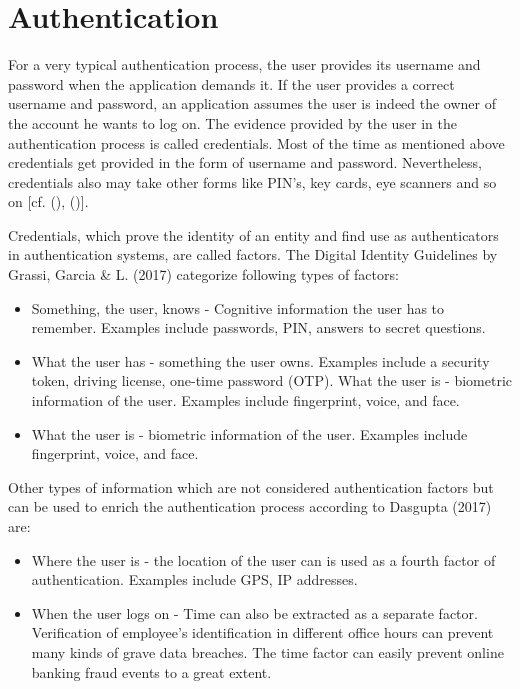 \section{Authentication}
\label{authentication}
For a very typical authentication process, the user provides its username and password when the application demands it. If the user provides a correct username and password, an application assumes the user is indeed the owner of the account he wants to log on. The evidence provided by the user in the authentication process is called credentials. Most of the time as mentioned above credentials get provided in the form of username and password. Nevertheless, credentials also may take other forms like PIN’s, key cards, eye scanners and so on [cf. (\cite{Todorov:2007:MUI}), (\cite{Boyd:2012:GSOAuth})]. 

Credentials, which prove the identity of an entity and find use as authenticators in authentication systems, are called factors. The Digital Identity Guidelines by Grassi, Garcia \& L. (2017) categorize following types of factors:

\begin{itemize}  
	\item Something, the user, knows - Cognitive information the user has to remember. Examples include passwords, PIN, answers to secret questions.
	\item What the user has - something the user owns. Examples include a security token, driving license, one-time password (OTP). 
	What the user is - biometric information of the user. Examples include fingerprint, voice, and face.  
	\item What the user is - biometric information of the user. Examples include fingerprint, voice, and face. 
\end{itemize}

Other types of information which are not considered authentication factors but  can be used to enrich the authentication process according to Dasgupta (2017) are:

\begin{itemize}
	\item Where the user is - the location of the user can is used as a fourth factor of authentication. Examples include GPS, IP addresses.
	\item When the user logs on - Time can also be extracted as a separate factor. Verification of employee’s identification in different office hours can prevent many kinds of grave data breaches. The time factor can easily prevent online banking fraud events to a great extent. 
\end{itemize}

